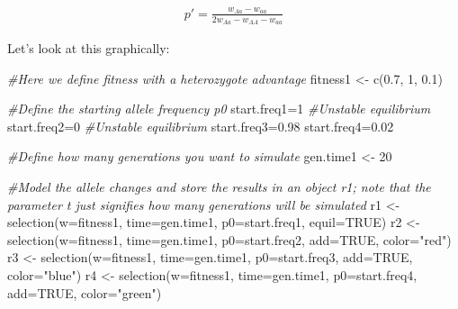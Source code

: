\documentclass[
]{book}
\newenvironment{Shaded}{\begin{snugshade}}{\end{snugshade}}
\newcommand{\AttributeTok}[1]{\textcolor[rgb]{0.77,0.63,0.00}{#1}}
\newcommand{\CommentTok}[1]{\textcolor[rgb]{0.56,0.35,0.01}{\textit{#1}}}
\newcommand{\ConstantTok}[1]{\textcolor[rgb]{0.00,0.00,0.00}{#1}}
\newcommand{\DecValTok}[1]{\textcolor[rgb]{0.00,0.00,0.81}{#1}}
\newcommand{\FloatTok}[1]{\textcolor[rgb]{0.00,0.00,0.81}{#1}}
\newcommand{\FunctionTok}[1]{\textcolor[rgb]{0.00,0.00,0.00}{#1}}
\newcommand{\NormalTok}[1]{#1}
\newcommand{\OtherTok}[1]{\textcolor[rgb]{0.56,0.35,0.01}{#1}}
\newcommand{\StringTok}[1]{\textcolor[rgb]{0.31,0.60,0.02}{#1}}
\begin{document}
\begin{align} 
p' = \frac{w_{Aa}-w_{aa}}{2w_{Aa}-w_{AA}-w_{aa}} \label{eq:22}
\end{align}

Let's look at this graphically:

\begin{Shaded}
\begin{Highlighting}[]
\CommentTok{\#Here we define fitness with a heterozygote advantage}
\NormalTok{fitness1 }\OtherTok{\textless{}{-}} \FunctionTok{c}\NormalTok{(}\FloatTok{0.7}\NormalTok{, }\DecValTok{1}\NormalTok{, }\FloatTok{0.1}\NormalTok{)}

\CommentTok{\#Define the starting allele frequency p0}
\NormalTok{start.freq1}\OtherTok{=}\DecValTok{1} \CommentTok{\#Unstable equilibrium}
\NormalTok{start.freq2}\OtherTok{=}\DecValTok{0} \CommentTok{\#Unstable equilibrium}
\NormalTok{start.freq3}\OtherTok{=}\FloatTok{0.98}
\NormalTok{start.freq4}\OtherTok{=}\FloatTok{0.02}

\CommentTok{\#Define how many generations you want to simulate}
\NormalTok{gen.time1 }\OtherTok{\textless{}{-}} \DecValTok{20}

\CommentTok{\#Model the allele changes and store the results in an object r1; note that the parameter t just signifies how many generations will be simulated}
\NormalTok{r1 }\OtherTok{\textless{}{-}} \FunctionTok{selection}\NormalTok{(}\AttributeTok{w=}\NormalTok{fitness1, }\AttributeTok{time=}\NormalTok{gen.time1, }\AttributeTok{p0=}\NormalTok{start.freq1, }\AttributeTok{equil=}\ConstantTok{TRUE}\NormalTok{)}
\NormalTok{r2 }\OtherTok{\textless{}{-}} \FunctionTok{selection}\NormalTok{(}\AttributeTok{w=}\NormalTok{fitness1, }\AttributeTok{time=}\NormalTok{gen.time1, }\AttributeTok{p0=}\NormalTok{start.freq2, }\AttributeTok{add=}\ConstantTok{TRUE}\NormalTok{, }\AttributeTok{color=}\StringTok{"red"}\NormalTok{)}
\NormalTok{r3 }\OtherTok{\textless{}{-}} \FunctionTok{selection}\NormalTok{(}\AttributeTok{w=}\NormalTok{fitness1, }\AttributeTok{time=}\NormalTok{gen.time1, }\AttributeTok{p0=}\NormalTok{start.freq3, }\AttributeTok{add=}\ConstantTok{TRUE}\NormalTok{, }\AttributeTok{color=}\StringTok{"blue"}\NormalTok{)}
\NormalTok{r4 }\OtherTok{\textless{}{-}} \FunctionTok{selection}\NormalTok{(}\AttributeTok{w=}\NormalTok{fitness1, }\AttributeTok{time=}\NormalTok{gen.time1, }\AttributeTok{p0=}\NormalTok{start.freq4, }\AttributeTok{add=}\ConstantTok{TRUE}\NormalTok{, }\AttributeTok{color=}\StringTok{"green"}\NormalTok{)}
\end{Highlighting}
\end{Shaded}
\end{document}
